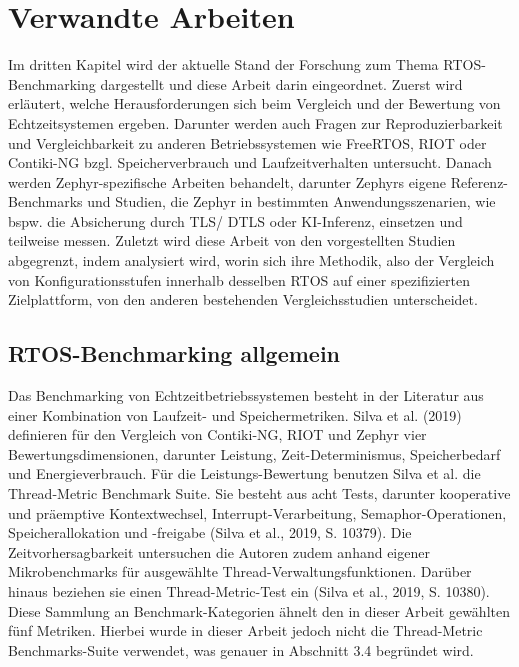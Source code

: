 \chapter{Verwandte Arbeiten}
\label{ch:verwandte-arbeiten}

Im dritten Kapitel wird der aktuelle Stand der Forschung zum Thema RTOS-Benchmarking dargestellt und diese Arbeit darin eingeordnet. Zuerst wird erl{\"a}utert, welche Herausforderungen sich beim Vergleich und der Bewertung von Echtzeitsystemen ergeben. Darunter werden auch Fragen zur Reproduzierbarkeit und Vergleichbarkeit zu anderen Betriebssystemen wie FreeRTOS, RIOT oder Contiki-NG bzgl. Speicherverbrauch und Laufzeitverhalten untersucht. Danach werden Zephyr-spezifische Arbeiten behandelt, darunter Zephyrs eigene Referenz-Benchmarks und Studien, die Zephyr in bestimmten Anwendungsszenarien, wie bspw. die Absicherung durch TLS/ DTLS oder KI-Inferenz, einsetzen und teilweise messen. Zuletzt wird diese Arbeit von den vorgestellten Studien abgegrenzt, indem analysiert wird, worin sich ihre Methodik, also der Vergleich von Konfigurationsstufen innerhalb desselben RTOS auf einer spezifizierten Zielplattform, von den anderen bestehenden Vergleichsstudien unterscheidet.

\section{RTOS-Benchmarking allgemein}
Das Benchmarking von Echtzeitbetriebssystemen besteht in der Literatur aus einer Kombination von Laufzeit- und Speichermetriken. Silva et al. (2019) definieren f{\"u}r den Vergleich von Contiki-NG, RIOT und Zephyr vier Bewertungsdimensionen, darunter Leistung, Zeit-Determinismus, Speicherbedarf und Energieverbrauch. F{\"u}r die Leistungs-Bewertung benutzen Silva et al. die Thread-Metric Benchmark Suite. Sie besteht aus acht Tests, darunter kooperative und pr{\"a}emptive Kontextwechsel, Interrupt-Verarbeitung, Semaphor-Operationen, Speicherallokation und -freigabe (Silva et al., 2019, S. 10379). Die Zeitvorhersagbarkeit untersuchen die Autoren zudem anhand eigener Mikrobenchmarks f{\"u}r ausgew{\"a}hlte Thread-Verwaltungsfunktionen. Dar{\"u}ber hinaus beziehen sie einen Thread-Metric-Test ein (Silva et al., 2019, S. 10380). Diese Sammlung an Benchmark-Kategorien {\"a}hnelt den in dieser Arbeit gew{\"a}hlten f{\"u}nf Metriken. Hierbei wurde in dieser Arbeit jedoch nicht die Thread-Metric Benchmarks-Suite verwendet, was genauer in Abschnitt 3.4 begr{\"u}ndet wird.

